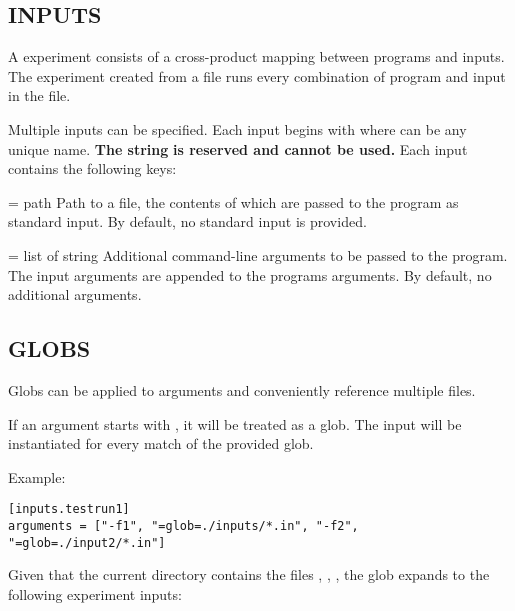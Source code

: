 \documentclass[a4paper,english]{article}
\begin{document}
\begin{adjustwidth}{18pt}{0pt}
    \section{INPUTS}

      A  experiment consists of a cross-product mapping between programs
      and inputs.
      The experiment created from a  file runs every combination
      of program and input in the file.

      Multiple inputs can be specified.
      Each input begins with  where  can be any unique name.
      \textbf{The string}  \textbf{is reserved and cannot be used.}
      Each input contains the following keys:

      \begin{Description}[Options]\setlength{\itemsep}{0cm}
          \item[\oOpt{input} = path]
            Path to a file, the contents of which are passed to the program as standard input.
            By default, no standard input is provided.
          \item[\oOpt{arguments} = list of string]
            Additional command-line arguments to be passed to the program.
            The input arguments are appended to the programs arguments.
            By default, no additional arguments.
      \end{Description}


      \subsection{GLOBS}

        Globs can be applied to arguments and conveniently reference multiple files.

          If an argument starts with , it will be treated as a glob.
          The input will be instantiated for every match of the provided glob.

            Example:

      \begin{verbatim}
[inputs.testrun1]
arguments = ["-f1", "=glob=./inputs/*.in", "-f2", "=glob=./input2/*.in"]
      \end{verbatim}

            Given that the current directory contains the files
            , , , the glob
            expands to the following experiment inputs:


\end{adjustwidth}
\end{document}
